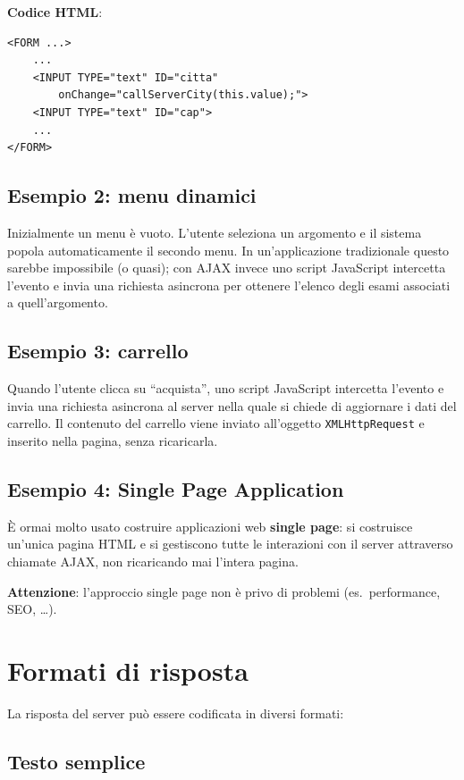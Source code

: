 \textbf{Codice HTML}:

\begin{lstlisting}[language=HTML5]
<FORM ...>
    ...
    <INPUT TYPE="text" ID="citta"
        onChange="callServerCity(this.value);">
    <INPUT TYPE="text" ID="cap">
    ...
</FORM>
\end{lstlisting}

\subsection{Esempio 2: menu dinamici}

Inizialmente un menu è vuoto. L'utente seleziona un argomento e il sistema popola automaticamente il secondo menu. In un'applicazione tradizionale questo sarebbe impossibile (o quasi); con AJAX invece uno script JavaScript intercetta l'evento e invia una richiesta asincrona per ottenere l'elenco degli esami associati a quell'argomento.

\subsection{Esempio 3: carrello}

Quando l'utente clicca su ``acquista'', uno script JavaScript intercetta l'evento e invia una richiesta asincrona al server nella quale si chiede di aggiornare i dati del carrello. Il contenuto del carrello viene inviato all'oggetto \texttt{XMLHttpRequest} e inserito nella pagina, senza ricaricarla.

\subsection{Esempio 4: Single Page Application}

È ormai molto usato costruire applicazioni web \textbf{single page}: si costruisce un'unica pagina HTML e si gestiscono tutte le interazioni con il server attraverso chiamate AJAX, non ricaricando mai l'intera pagina.

\textbf{Attenzione}: l'approccio single page non è privo di problemi (es.\ performance, SEO, \dots).

\section{Formati di risposta}

La risposta del server può essere codificata in diversi formati:

\subsection{Testo semplice}

